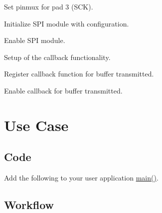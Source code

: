 \begin{DoxyEnumerate}
\begin{DoxyEnumerate}
\item Set pinmux for pad 3 (S\+CK). 
\begin{DoxyCodeInclude}{0}
\end{DoxyCodeInclude}

\item Initialize S\+PI module with configuration. 
\begin{DoxyCodeInclude}{0}
\end{DoxyCodeInclude}

\item Enable S\+PI module. 
\begin{DoxyCodeInclude}{0}
\end{DoxyCodeInclude}

\end{DoxyEnumerate}
\item Setup of the callback functionality. 
\begin{DoxyCodeInclude}{0}
\end{DoxyCodeInclude}

\begin{DoxyEnumerate}
\item Register callback function for buffer transmitted. 
\begin{DoxyCodeInclude}{0}
\end{DoxyCodeInclude}

\item Enable callback for buffer transmitted. 
\begin{DoxyCodeInclude}{0}
\end{DoxyCodeInclude}
 
\end{DoxyEnumerate}
\end{DoxyEnumerate}\hypertarget{asfdoc_sam0_sercom_spi_slave_callback_use_asfdoc_sam0_sercom_spi_slave_callback_usecase}{}\section{Use Case}\label{asfdoc_sam0_sercom_spi_slave_callback_use_asfdoc_sam0_sercom_spi_slave_callback_usecase}
\hypertarget{asfdoc_sam0_sercom_spi_slave_callback_use_asfdoc_sam0_sercom_spi_slave_callback_usecase_code}{}\subsection{Code}\label{asfdoc_sam0_sercom_spi_slave_callback_use_asfdoc_sam0_sercom_spi_slave_callback_usecase_code}
Add the following to your user application {\ttfamily \mbox{\hyperlink{csc__app_8c_a840291bc02cba5474a4cb46a9b9566fe}{main()}}}. 
\begin{DoxyCodeInclude}{0}
\end{DoxyCodeInclude}
\hypertarget{asfdoc_sam0_sercom_spi_slave_callback_use_asfdoc_sam0_sercom_spi_slave_callback_usecase_workflow}{}\subsection{Workflow}\label{asfdoc_sam0_sercom_spi_slave_callback_use_asfdoc_sam0_sercom_spi_slave_callback_usecase_workflow}

